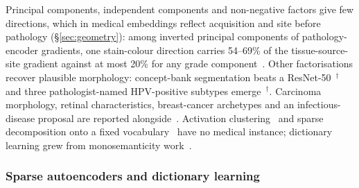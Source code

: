 Principal components, independent components and non-negative factors give few directions, which in
medical embeddings reflect acquisition and site before pathology (\S\ref{sec:geometry}): among inverted
principal components of pathology-encoder gradients, one stain-colour direction carries 54--69\% of the
tissue-source-site gradient against at most 20\% for any grade component~\cite{howard2024generative}.
Other factorisations recover plausible morphology: concept-bank segmentation beats a
ResNet-50~\cite{gildenblat2024segmentation}$^{\dagger}$ and three pathologist-named HPV-positive
subtypes emerge~\cite{hieromnimon2025analysis}$^{\dagger}$. Carcinoma morphology, retinal characteristics,
breast-cancer archetypes and an infectious-disease proposal are reported
alongside~\cite{qin2026clearhpv,varshney2024generating,beyeler2024comparing,fournier2026prognostic,sizikova2022automatic}.
Activation clustering~\cite{ghorbani2019automating,fel2023a} and sparse decomposition onto a fixed
vocabulary~\cite{bhalla2024interpreting} have no medical instance; dictionary learning grew from
monosemanticity work~\cite{bricken2023monosemanticity,templeton2026scaling}.

\subsubsection{Sparse autoencoders and dictionary learning}

